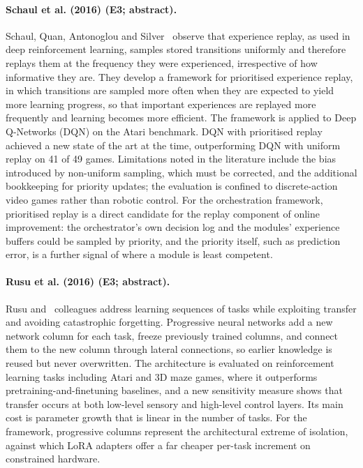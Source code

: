 \documentclass[10pt,a4paper]{article}
\begin{document}
\paragraph{Schaul et al. (2016) (E3; abstract).} Schaul, Quan, Antonoglou and Silver~\cite{Schaul2016} observe that experience replay, as used in deep reinforcement learning, samples stored transitions uniformly and therefore replays them at the frequency they were experienced, irrespective of how informative they are. They develop a framework for prioritised experience replay, in which transitions are sampled more often when they are expected to yield more learning progress, so that important experiences are replayed more frequently and learning becomes more efficient. The framework is applied to Deep Q-Networks (DQN) on the Atari benchmark. DQN with prioritised replay achieved a new state of the art at the time, outperforming DQN with uniform replay on 41 of 49 games. Limitations noted in the literature include the bias introduced by non-uniform sampling, which must be corrected, and the additional bookkeeping for priority updates; the evaluation is confined to discrete-action video games rather than robotic control. For the orchestration framework, prioritised replay is a direct candidate for the replay component of online improvement: the orchestrator's own decision log and the modules' experience buffers could be sampled by priority, and the priority itself, such as prediction error, is a further signal of where a module is least competent.

\paragraph{Rusu et al. (2016) (E3; abstract).} Rusu and~\cite{Rusu2016} colleagues address learning sequences of tasks while exploiting transfer and avoiding catastrophic forgetting. Progressive neural networks add a new network column for each task, freeze previously trained columns, and connect them to the new column through lateral connections, so earlier knowledge is reused but never overwritten. The architecture is evaluated on reinforcement learning tasks including Atari and 3D maze games, where it outperforms pretraining-and-finetuning baselines, and a new sensitivity measure shows that transfer occurs at both low-level sensory and high-level control layers. Its main cost is parameter growth that is linear in the number of tasks. For the framework, progressive columns represent the architectural extreme of isolation, against which LoRA adapters offer a far cheaper per-task increment on constrained hardware.
\end{document}
